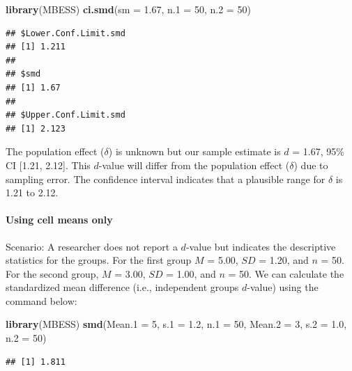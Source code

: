 \documentclass[
]{krantz}
\makeatletter
\newenvironment{Shaded}{\begin{snugshade}}{\end{snugshade}}
\newcommand{\DataTypeTok}[1]{\textcolor[rgb]{0.27,0.27,0.27}{#1}}
\newcommand{\DecValTok}[1]{\textcolor[rgb]{0.06,0.06,0.06}{#1}}
\newcommand{\FloatTok}[1]{\textcolor[rgb]{0.06,0.06,0.06}{#1}}
\newcommand{\KeywordTok}[1]{\textcolor[rgb]{0.27,0.27,0.27}{\textbf{#1}}}
\newcommand{\NormalTok}[1]{#1}
\newenvironment{kframe}{%
\medskip{}
\setlength{\fboxsep}{.8em}
 \def\at@end@of@kframe{}%
 \ifinner\ifhmode%
  \def\at@end@of@kframe{\end{minipage}}%
  \begin{minipage}{\columnwidth}%
 \fi\fi%
 \def\FrameCommand##1{\hskip\@totalleftmargin \hskip-\fboxsep
 \colorbox{shadecolor}{##1}\hskip-\fboxsep
     \hskip-\linewidth \hskip-\@totalleftmargin \hskip\columnwidth}%
 \MakeFramed {\advance\hsize-\width
   \@totalleftmargin\z@ \linewidth\hsize
   \@setminipage}}%
 {\par\unskip\endMakeFramed%
 \at@end@of@kframe}
\renewenvironment{Shaded}{\begin{kframe}}{\end{kframe}}
\makeatother
\begin{document}
\begin{Shaded}
\begin{Highlighting}[]
\KeywordTok{library}\NormalTok{(MBESS)}
\KeywordTok{ci.smd}\NormalTok{(}\DataTypeTok{sm =} \FloatTok{1.67}\NormalTok{, }\DataTypeTok{n.1 =} \DecValTok{50}\NormalTok{, }\DataTypeTok{n.2 =} \DecValTok{50}\NormalTok{) }
\end{Highlighting}
\end{Shaded}

\begin{verbatim}
## $Lower.Conf.Limit.smd
## [1] 1.211
## 
## $smd
## [1] 1.67
## 
## $Upper.Conf.Limit.smd
## [1] 2.123
\end{verbatim}

The population effect (\(\delta\)) is unknown but our sample estimate is \(d\) = 1.67, 95\% CI {[}1.21, 2.12{]}. This \(d\)-value will differ from the population effect (\(\delta\)) due to sampling error. The confidence interval indicates that a plausible range for \(\delta\) is 1.21 to 2.12.

\hypertarget{using-cell-means-only}{%
\paragraph{Using cell means only}\label{using-cell-means-only}}

Scenario: A researcher does not report a \(d\)-value but indicates the descriptive statistics for the groups. For the first group \(M\) = 5.00, \(SD\) = 1.20, and \(n\) = 50. For the second group, \(M\) = 3.00, \(SD\) = 1.00, and \(n\) = 50. We can calculate the standardized mean difference (i.e., independent groups \(d\)-value) using the command below:

\begin{Shaded}
\begin{Highlighting}[]
\KeywordTok{library}\NormalTok{(MBESS)}
\KeywordTok{smd}\NormalTok{(}\DataTypeTok{Mean.1 =} \DecValTok{5}\NormalTok{,}
    \DataTypeTok{s.1 =} \FloatTok{1.2}\NormalTok{, }
    \DataTypeTok{n.1 =} \DecValTok{50}\NormalTok{, }
    \DataTypeTok{Mean.2 =} \DecValTok{3}\NormalTok{, }
    \DataTypeTok{s.2 =} \FloatTok{1.0}\NormalTok{, }
    \DataTypeTok{n.2 =} \DecValTok{50}\NormalTok{) }
\end{Highlighting}
\end{Shaded}

\begin{verbatim}
## [1] 1.811
\end{verbatim}
\end{document}
